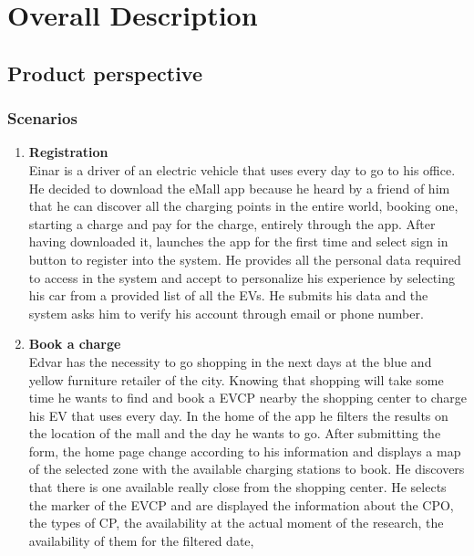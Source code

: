 \section{Overall Description}

\subsection{Product perspective}

\subsubsection{Scenarios}
\begin{enumerate}[label=\textbf{\Alph*}.]
      \item \textbf{Registration} \\
            Einar is a driver of an electric vehicle that uses every day to go to his
            office. He decided to download the eMall app because he heard by a friend
            of him that he can discover all the charging points in the entire world,
            booking one, starting a charge and pay for the charge, entirely through
            the app. After having downloaded it, launches the app for the first time
            and select sign in button to register into the system. He provides all
            the personal data required to access in the system and accept to personalize
            his experience by selecting his car from a provided list of all the EVs.
            He submits his data and the system asks him to verify his account through email or phone number.
      \item \textbf{Book a charge} \\
            Edvar has the necessity to go shopping in the next days at the blue and yellow furniture retailer of the city. Knowing
            that shopping will take some time he wants to find and book a EVCP nearby the shopping center to charge his EV that uses every day.
            In the home of the app he filters the results on the location of the mall and the day he wants to go.
            After submitting the form, the home page change according to his information and displays
            a map of the selected zone with the available charging stations to book. He discovers that there is one available
            really close from the shopping center. He selects the marker of the EVCP and are displayed the information about the CPO,
            the types of CP, the availability at the actual moment of the research, the availability of them for the filtered date,

\end{enumerate}
